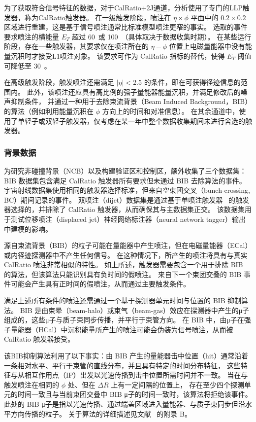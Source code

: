 为了获取符合信号特征的数据，对于CalRatio+2J通道，分析使用了专门的LLP触发器，称为CalRatio触发器。
在一级触发阶段，喷注在 $\eta \times \phi$ 平面中的 $0.2 \times 0.2$ 区域进行重建，这是基于信号喷注通常比标准模型喷注更窄的事实。
选取的事件要求喷注的横能量 $E_T$ 超过 60~\GeV 或 100~\GeV（具体取决于数据收集时期）。
在某些运行阶段，存在一些触发器，其要求仅在喷注所在的 $\eta - \phi$ 位置上电磁量能器中没有能量沉积时才接受L1喷注对象。
该要求可作为 CalRatio 指标的替代，使得 $E_T$ 阈值可降低至 30~\GeV。

在高级触发阶段，触发喷注还需满足 $|\eta| < 2.5$ 的条件，即在可获得径迹信息的范围内。
此外，该喷注还应具有高比例的强子量能器能量沉积，并满足修改后的噪声抑制条件，
并通过一种用于去除束流背景（Beam Induced Background，BIB）的算法（例如利用能量沉积在 $\phi$ 方向上的时间和对准信息）。
在其余通道中，使用了单轻子或双轻子触发器，仅考虑在某一年中整个数据收集期间未进行舍选的触发器。


\subsubsection{背景数据}
为研究非碰撞背景（NCB）以及构建验证区和控制区，额外收集了三个数据集：
BIB 数据集包含满足 CalRatio 触发器所有要求但未通过 BIB 去除算法的事件。
宇宙射线数据集使用相同的触发器选择标准，但来自空束团交叉（bunch-crossing, BC）期间记录的事件。
双喷注（dijet）数据集是通过基于单喷注触发器~\cite{trigger} 的触发器选择的，并排除了 CalRatio 触发器，从而确保其与主数据集正交。
该数据集用于测试位移喷注（displaced jet）神经网络标注器（neural network tagger）输出中建模的影响。

源自束流背景（BIB）的粒子可能在量能器中产生喷注，但在电磁量能器（ECal）或内径迹探测器中不产生任何信号。
在这种情况下，所产生的喷注将具有与真实 CalRatio 喷注非常相似的特性。
如上所述，触发器需要包含一个用于排除 BIB 的算法，但该算法只能识别具有负时间的假喷注。
来自下一个束团交叠的 BIB 事件可能会产生具有正时间的假喷注，从而通过主要触发条件。

满足上述所有条件的喷注还需通过一个基于探测器单元时间与位置的 BIB 抑制算法。
BIB 是由束晕（beam-halo）或束气（beam-gas）效应在探测器中产生的μ子组成的，这些μ子与质子束同步传播，并平行于束管方向。
在 BIB 中，由μ子在强子量能器（HCal）中沉积能量所产生的喷注可能会伪装为信号喷注，从而被 CalRatio 触发器接受。

该BIB抑制算法利用了以下事实：由 BIB 产生的量能器击中位置（hit）通常沿着一条相对水平、平行于束管的直线分布，并且具有特定的时间分布特征，
这些特征与从相互作用点（IP）出发以光速传播到击中位置所需时间并不一致。
当在与触发喷注在相同的 $\phi$ 处、但在 $\Delta R$ 上有一定间隔的位置上，
存在至少四个探测单元的时间一致且与当前束团交叠中 BIB μ子的时间一致时，该算法将拒绝该事件。
此处的 BIB μ子是指以光速传播、通过端盖区域进入量能器、与质子束同步但沿水平方向传播的粒子。
关于算法的详细描述见文献~\cite{ATLAS-CONF-2016-103} 的附录 B。

